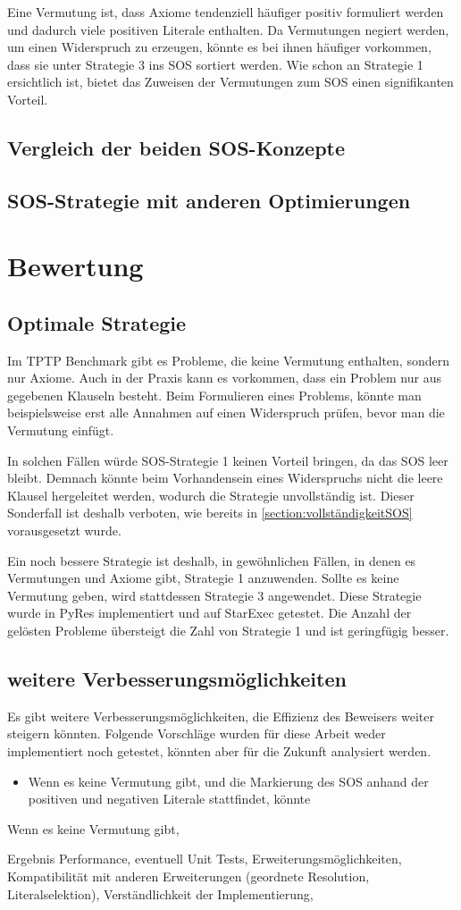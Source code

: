 		Eine Vermutung ist, dass Axiome tendenziell häufiger positiv formuliert werden und dadurch viele positiven Literale enthalten. Da Vermutungen negiert werden, um einen Widerspruch zu erzeugen, könnte es bei ihnen häufiger vorkommen, dass sie unter Strategie 3 ins SOS sortiert werden. Wie schon an Strategie 1 ersichtlich ist, bietet das Zuweisen der Vermutungen zum SOS einen signifikanten Vorteil.

	
	\subsection{Vergleich der beiden SOS-Konzepte}
	\subsection{SOS-Strategie mit anderen Optimierungen}
		
\section{Bewertung}
	\subsection{Optimale Strategie}
	Im TPTP Benchmark gibt es Probleme, die keine Vermutung enthalten, sondern nur Axiome. Auch in der Praxis kann es vorkommen, dass ein Problem nur aus gegebenen Klauseln besteht. Beim Formulieren eines Problems, könnte man beispielsweise erst alle Annahmen auf einen Widerspruch prüfen, bevor man die Vermutung einfügt.
	
	In solchen Fällen würde SOS-Strategie 1 keinen Vorteil bringen, da das SOS leer bleibt. Demnach könnte beim Vorhandensein eines Widerspruchs nicht die leere Klausel hergeleitet werden, wodurch die Strategie unvollständig ist. Dieser Sonderfall ist deshalb verboten, wie bereits in \ref{section:vollständigkeitSOS} vorausgesetzt wurde.
	
	Ein noch bessere Strategie ist deshalb, in gewöhnlichen Fällen, in denen es Vermutungen und Axiome gibt, Strategie 1 anzuwenden. Sollte es keine Vermutung geben, wird stattdessen Strategie 3 angewendet. Diese Strategie wurde in PyRes implementiert und auf StarExec getestet. Die Anzahl der gelösten Probleme übersteigt die Zahl von Strategie 1 und ist geringfügig besser.
	
	\subsection{weitere Verbesserungsmöglichkeiten}
	Es gibt weitere Verbesserungsmöglichkeiten, die Effizienz des Beweisers weiter steigern könnten. Folgende Vorschläge wurden für diese Arbeit weder implementiert noch getestet, könnten aber für die Zukunft analysiert werden.
	\begin{itemize}
		\item Wenn es keine Vermutung gibt, und die Markierung des SOS anhand der positiven und negativen Literale stattfindet, könnte 
	\end{itemize}
		Wenn es keine Vermutung gibt, 
	
Ergebnis Performance,
eventuell Unit Tests,
Erweiterungsmöglichkeiten,
Kompatibilität mit anderen Erweiterungen (geordnete Resolution, Literalselektion),
Verständlichkeit der Implementierung,

